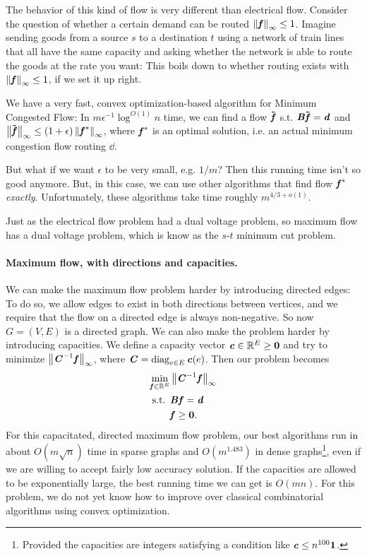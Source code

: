 The behavior of this kind of flow is very different than electrical
flow. Consider the question of whether a certain demand can be routed
$\left\| \boldsymbol{\mathit{f}} \right\|_{\infty} \leq 1$.
Imagine sending goods from a source $s$ to a destination $t$ using a
network of train lines that all have the
same capacity and asking whether the network is able to route the
goods at the rate you want: This boils down to whether routing exists
with $\left\| \boldsymbol{\mathit{f}} \right\|_{\infty} \leq 1$, if we set it up right.

We have a very fast, convex optimization-based algorithm for Minimum Congested Flow:
In $m \epsilon^{-1} \log^{O(1)} n$ time, we can find a flow $\boldsymbol{\tilde{\mathit{f}}}$
s.t. $\boldsymbol{\mathit{B}} \boldsymbol{\tilde{\mathit{f}}} = \boldsymbol{\mathit{d}}$ and $\left\| \boldsymbol{\tilde{\mathit{f}}} \right\|_{\infty} \leq
(1+\epsilon)\left\| \boldsymbol{\mathit{f}}^* \right\|_{\infty}$, where $\boldsymbol{\mathit{f}}^*$ is an optimal solution, i.e. an
actual minimum congestion flow routing $\dd$.

But what if we want $\epsilon$ to be very small, e.g. $1/m$? Then this running
time isn't so good anymore.
But, in this case, we can use other algorithms that find flow $\boldsymbol{\mathit{f}}^*$
\emph{exactly}. Unfortunately, these algorithms take time roughly $m^{4/3+o(1)}$.

Just as the electrical flow problem had a dual voltage problem, so
maximum flow has a dual voltage problem, which is know as the
$s$-$t$ minimum cut problem.

\paragraph{Maximum flow, with directions and capacities.}
We can make the maximum flow problem harder by introducing directed
edges: To do so, we allow edges to exist in both directions between vertices, and we require that the flow on a directed edge is
always non-negative. So now $G=(V,E)$ is a directed graph.
We can also make the problem harder by introducing capacities.
We define a capacity vector $\boldsymbol{\mathit{c}} \in \mathbb{R}^E \geq \boldsymbol{0}$ and try to minimize $\left\| \boldsymbol{\mathit{C}}^{-1} \boldsymbol{\mathit{f}} \right\|_{\infty}$, where $\boldsymbol{\mathit{C}} =
\operatorname*{diag}_{e \in E}\boldsymbol{\mathit{c}}(e)$.
Then our problem becomes
\begin{align*}
\min_{\boldsymbol{\mathit{f}} \in \mathbb{R}^E } & \left\| \boldsymbol{\mathit{C}}^{-1} \boldsymbol{\mathit{f}} \right\|_{\infty} \\
  \textrm{s.t. } &  \boldsymbol{\mathit{B}} \boldsymbol{\mathit{f}} = \boldsymbol{\mathit{d}}\\
                     &  \boldsymbol{\mathit{f}} \geq \boldsymbol{0}.
\end{align*}
For this capacitated, directed maximum flow problem, our best
algorithms run in about $O( m \sqrt{n} )$ time in sparse graphs and $O(
m^{1.483} )$ in dense graphs\footnote{Provided the
  capacities are integers satisfying a condition like $\boldsymbol{\mathit{c}} \leq n^{100} \boldsymbol{1}$.}, even if we are willing to
accept fairly low accuracy solution.
If the capacities are allowed to be exponentially large, the best
running time we can get is $O(m n)$.
For this problem, we do not yet know how to improve over classical
combinatorial algorithms using convex optimization.

